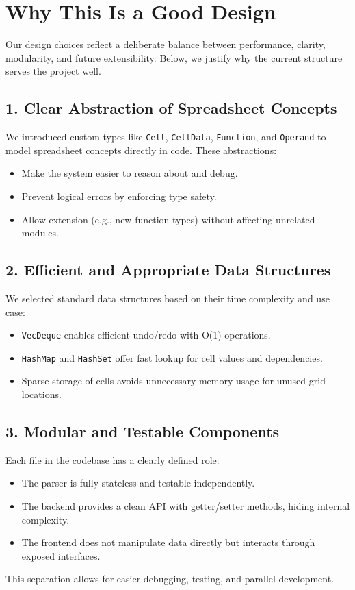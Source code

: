 \documentclass{article}
\begin{document}
\section*{Why This Is a Good Design}

Our design choices reflect a deliberate balance between performance, clarity, modularity, and future extensibility. Below, we justify why the current structure serves the project well.

\subsection*{1. Clear Abstraction of Spreadsheet Concepts}

We introduced custom types like \texttt{Cell}, \texttt{CellData}, \texttt{Function}, and \texttt{Operand} to model spreadsheet concepts directly in code. These abstractions:
\begin{itemize}
    \item Make the system easier to reason about and debug.
    \item Prevent logical errors by enforcing type safety.
    \item Allow extension (e.g., new function types) without affecting unrelated modules.
\end{itemize}

\subsection*{2. Efficient and Appropriate Data Structures}

We selected standard data structures based on their time complexity and use case:
\begin{itemize}
    \item \texttt{VecDeque} enables efficient undo/redo with O(1) operations.
    \item \texttt{HashMap} and \texttt{HashSet} offer fast lookup for cell values and dependencies.
    \item Sparse storage of cells avoids unnecessary memory usage for unused grid locations.
\end{itemize}

\subsection*{3. Modular and Testable Components}

Each file in the codebase has a clearly defined role:
\begin{itemize}
    \item The parser is fully stateless and testable independently.
    \item The backend provides a clean API with getter/setter methods, hiding internal complexity.
    \item The frontend does not manipulate data directly but interacts through exposed interfaces.
\end{itemize}
This separation allows for easier debugging, testing, and parallel development.
\end{document}
